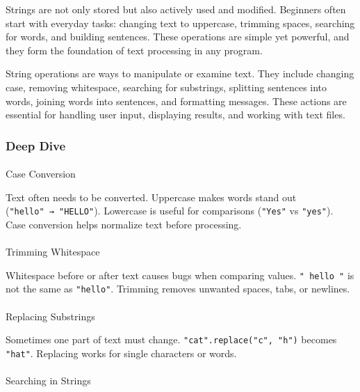 \documentclass[
  letterpaper,
  DIV=11,
  numbers=noendperiod]{scrreprt}
\makeatletter
\let\oldparagraph\paragraph
\renewcommand{\paragraph}{
    \@ifstar
      \xxxParagraphStar
      \xxxParagraphNoStar
  }
\newcommand{\xxxParagraphStar}[1]{\oldparagraph*{#1}\mbox{}}
\newcommand{\xxxParagraphNoStar}[1]{\oldparagraph{#1}\mbox{}}
\makeatother
\begin{document}
Strings are not only stored but also actively used and modified.
Beginners often start with everyday tasks: changing text to uppercase,
trimming spaces, searching for words, and building sentences. These
operations are simple yet powerful, and they form the foundation of text
processing in any program.

String operations are ways to manipulate or examine text. They include
changing case, removing whitespace, searching for substrings, splitting
sentences into words, joining words into sentences, and formatting
messages. These actions are essential for handling user input,
displaying results, and working with text files.

\subsubsection{Deep Dive}\label{deep-dive-25}

\paragraph{Case Conversion}\label{case-conversion}

Text often needs to be converted. Uppercase makes words stand out
(\texttt{"hello"\ →\ "HELLO"}). Lowercase is useful for comparisons
(\texttt{"Yes"} vs \texttt{"yes"}). Case conversion helps normalize text
before processing.

\paragraph{Trimming Whitespace}\label{trimming-whitespace}

Whitespace before or after text causes bugs when comparing values.
\texttt{"\ hello\ "} is not the same as \texttt{"hello"}. Trimming
removes unwanted spaces, tabs, or newlines.

\paragraph{Replacing Substrings}\label{replacing-substrings}

Sometimes one part of text must change.
\texttt{"cat".replace("c",\ "h")} becomes \texttt{"hat"}. Replacing
works for single characters or words.

\paragraph{Searching in Strings}\label{searching-in-strings}
\end{document}
